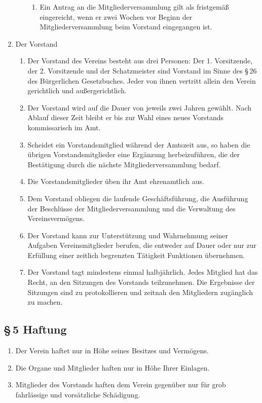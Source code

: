 \documentclass[12pt,a4paper]{article}
\begin{document}
\begin{enumerate}
\begin{enumerate}
\begin{enumerate}
\item Ein Antrag an die Mitgliederversammlung gilt als fristgemäß eingereicht, wenn er zwei Wochen vor Beginn der Mitgliederversammlung beim Vorstand eingegangen ist.
\end{enumerate}
\end{enumerate}
\item Der Vorstand
\begin{enumerate}
\item Der Vorstand des Vereins besteht aus drei Personen: Der 1. Vorsitzende, der 2. Vorsitzende und der Schatzmeister sind Vorstand im Sinne des §\,26 des Bürgerlichen Gesetzbuches. Jeder von ihnen vertritt allein den Verein gerichtlich und außergerichtlich.
\item Der Vorstand wird auf die Dauer von jeweils zwei Jahren gewählt. Nach Ablauf dieser Zeit bleibt er bis zur Wahl eines neues Vorstands kommissarisch im Amt.
\item Scheidet ein Vorstandsmitglied während der Amtszeit aus, so haben die übrigen Vorstandsmitglieder eine Ergänzung herbeizuführen, die der Bestätigung durch die nächste Mitgliederversammlung bedarf.
\item Die Vorstandsmitglieder üben ihr Amt ehrenamtlich aus.
\item Dem Vorstand obliegen die laufende Geschäftsführung, die Ausführung der Beschlüsse der Mitgliederversammlung und die Verwaltung des Vereinsvermögens.
\item Der Vorstand kann zur Unterstützung und Wahrnehmung seiner Aufgaben Vereinsmitglieder berufen, die entweder auf Dauer oder nur zur Erfüllung einer zeitlich begrenzten Tätigkeit Funktionen übernehmen.
\item Der Vorstand tagt mindestens einmal halbjährlich. Jedes Mitglied hat das Recht, an den Sitzungen des Vorstands teilzunehmen. Die Ergebnisse der Sitzungen sind zu protokollieren und zeitnah den Mitgliedern zugänglich zu machen.
\end{enumerate}
\end{enumerate}


\subsection*{§\,5 Haftung}
\begin{enumerate}
\item Der Verein haftet nur in Höhe seines Besitzes und Vermögens.
\item Die Organe und Mitglieder haften nur in Höhe Ihrer Einlagen.
\item Mitglieder des Vorstands haften dem Verein gegenüber nur für grob fahrlässige und vorsätzliche Schädigung.
\end{enumerate}
\end{document}
